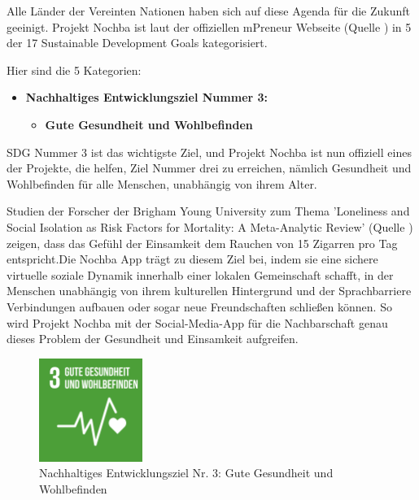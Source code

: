 Alle Länder der Vereinten Nationen haben sich auf diese Agenda für die Zukunft geeinigt. Projekt Nochba ist laut der offiziellen mPreneur Webseite (Quelle \cite{mPreneur-Website}) in 5 der 17 Sustainable Development Goals kategorisiert.

Hier sind die 5 Kategorien:

\begin{itemize}
    \item \textbf{Nachhaltiges Entwicklungsziel Nummer 3:}
          \begin{itemize}
              \item \textbf{Gute Gesundheit und Wohlbefinden}
          \end{itemize}
\end{itemize}

SDG Nummer 3 ist das wichtigste Ziel, und Projekt Nochba ist nun offiziell eines der Projekte, die helfen, Ziel Nummer drei zu erreichen, nämlich Gesundheit und Wohlbefinden für alle Menschen, unabhängig von ihrem Alter.

Studien der Forscher der Brigham Young University zum Thema 'Loneliness and Social Isolation as Risk Factors for Mortality: A Meta-Analytic Review' (Quelle \cite{Loneliness-and-Social-Isolation}) zeigen, dass das Gefühl der Einsamkeit dem Rauchen von 15 Zigarren pro Tag entspricht.Die Nochba App trägt zu diesem Ziel bei, indem sie eine sichere virtuelle soziale Dynamik innerhalb einer lokalen Gemeinschaft schafft, in der Menschen unabhängig von ihrem kulturellen Hintergrund und der Sprachbarriere Verbindungen aufbauen oder sogar neue Freundschaften schließen können. So wird Projekt Nochba mit der Social-Media-App für die Nachbarschaft genau dieses Problem der Gesundheit und Einsamkeit aufgreifen.

\begin{figure}[H]
    \centering
    \includegraphics[width=0.3\textwidth]{pics/3-Gesundheit-und-Wohlbefinden.png}
    \caption{Nachhaltiges Entwicklungsziel Nr. 3: Gute Gesundheit und Wohlbefinden}
    \label{fig:SDG03}
\end{figure}

